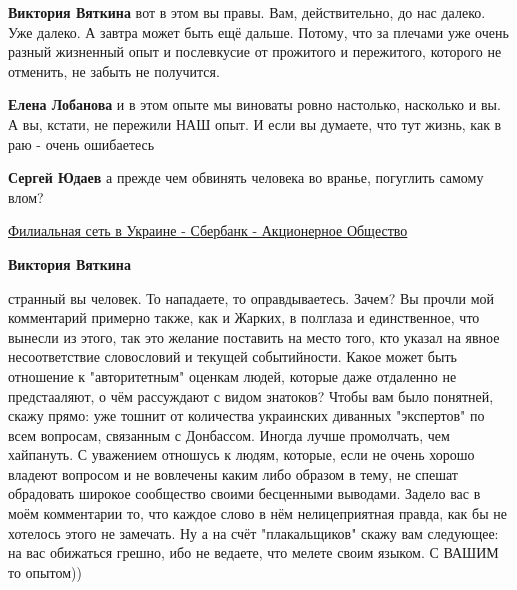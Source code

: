 \begin{itemize}
\begin{itemize}
\textbf{Виктория Вяткина} вот в этом вы правы. Вам, действительно, до нас далеко. Уже далеко. А завтра может быть ещё дальше. Потому, что за плечами уже очень разный жизненный опыт и послевкусие от прожитого и пережитого, которого не отменить, не забыть не получится.

 
\textbf{Елена Лобанова} и в этом опыте мы виноваты ровно настолько, насколько и вы. А вы, кстати, не пережили НАШ опыт. И если вы думаете, что тут жизнь, как в раю - очень ошибаетесь

 
\textbf{Сергей Юдаев} а прежде чем обвинять человека во вранье, погуглить самому влом?

\href{https://www.sbrf.com.ua/branches/}{%
Филиальная сеть в Украине - Сбербанк - Акционерное Общество%
}

 
\textbf{Виктория Вяткина} 

странный вы человек. То нападаете, то оправдываетесь. Зачем? Вы прочли мой
комментарий примерно также, как и Жарких, в полглаза и единственное, что
вынесли из этого, так это желание поставить на место того, кто указал на явное
несоответствие словословий и текущей событийности. Какое может быть отношение к
"авторитетным" оценкам людей, которые даже отдаленно не предстааляют, о чём
рассуждают с видом знатоков? Чтобы вам было понятней, скажу прямо: уже тошнит
от количества украинских диванных "экспертов" по всем вопросам, связанным с
Донбассом. Иногда лучше промолчать, чем хайпануть. С уважением отношусь к
людям, которые, если не очень хорошо владеют вопросом и не вовлечены каким либо
образом в тему, не спешат обрадовать широкое сообщество своими бесценными
выводами. Задело вас в моём комментарии то, что каждое слово в нём
нелицеприятная правда, как бы не хотелось этого не замечать. Ну а на счёт
"плакальщиков" скажу вам следующее: на вас обижаться грешно, ибо не ведаете,
что мелете своим языком. С ВАШИМ то опытом))


\end{itemize}
\end{itemize}
